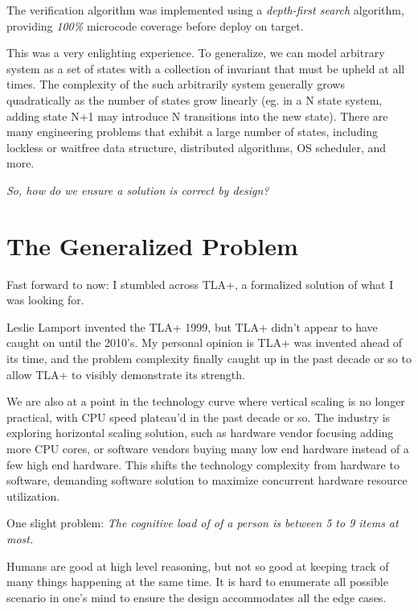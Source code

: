 \documentclass{report}
\begin{document}
The verification algorithm was implemented using a \textit{depth-first search}
algorithm, providing \textit{100\%} microcode coverage before deploy on
target.\newline

This was a very enlighting experience. To generalize, we can model arbitrary
system as a set of states with a collection of invariant that must be upheld at
all times. The complexity of the such arbitrarily system generally grows
quadratically as the number of states grow linearly (eg. in a N state system, 
adding state N+1 may introduce N transitions into the new state). There are many
engineering problems that exhibit a large number of states, including lockless
or waitfree data structure, distributed algorithms, OS scheduler, and more.  \newline

\textit{So, how do we ensure a solution is correct by design?}

\section{The Generalized Problem}

Fast forward to now: I stumbled across TLA+, a formalized solution of what I was
looking for.\newline

Leslie Lamport invented the TLA+ 1999, but TLA+ didn't appear to have caught on
until the 2010's. My personal opinion is TLA+ was invented ahead of its time,
and the problem complexity finally caught up in the past decade or so to allow
TLA+ to visibly demonstrate its strength.\newline

We are also at a point in the technology curve where vertical scaling is no
longer practical, with CPU speed plateau'd in the past decade or so. The
industry is exploring horizontal scaling solution, such as hardware vendor
focusing adding more CPU cores, or software vendors buying many low end hardware
instead of a few high end hardware. This shifts the technology complexity from
hardware to software, demanding software solution to maximize concurrent
hardware resource utilization. \newline

One slight problem: \textit{The cognitive load of of a person is between 5 to 9
items at most.}\newline

Humans are good at high level reasoning, but not so good at keeping track of
many things happening at the same time. It is hard to enumerate all possible
scenario in one's mind to ensure the design accommodates all the edge cases.
\newline
\end{document}
